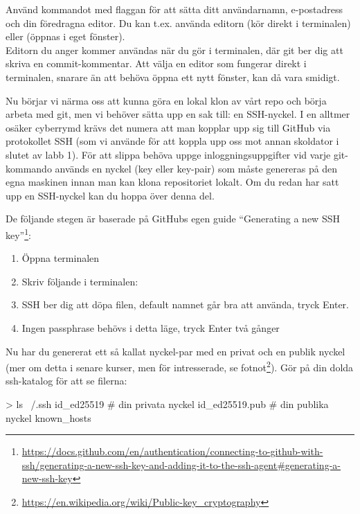 \begin{Datorarbete}
	\code{[\ref{git-config}]} Använd kommandot  med flaggan  för att sätta ditt användarnamn, e-postadress och din föredragna editor. Du kan t.ex. använda editorn  (kör direkt i terminalen) eller  (öppnas i eget fönster).
	\\

	Editorn du anger kommer användas när du gör  i terminalen, där git ber dig att skriva en commit-kommentar. Att välja en editor som fungerar direkt i terminalen, snarare än att behöva öppna ett nytt fönster, kan då vara smidigt.

	\item Nu börjar vi närma oss att kunna göra en lokal klon av vårt repo och börja arbeta med git, men vi behöver sätta upp en sak till: en SSH-nyckel. I en alltmer osäker cyberrymd krävs det numera att man kopplar upp sig till GitHub via protokollet SSH (som vi använde för att koppla upp oss mot annan skoldator i slutet av labb 1). För att slippa behöva uppge inloggningsuppgifter vid varje git-kommando används en nyckel (key eller key-pair) som måste genereras på den egna maskinen innan man kan klona repositoriet lokalt. Om du redan har satt upp en SSH-nyckel kan du hoppa över denna del.

	\vspace*{3mm}

	\noindent De följande stegen är baserade på GitHubs egen guide ``Generating a new SSH key''\footnote{\url{https://docs.github.com/en/authentication/connecting-to-github-with-ssh/generating-a-new-ssh-key-and-adding-it-to-the-ssh-agent#generating-a-new-ssh-key}}:

	\begin{enumerate}
		\item Öppna terminalen
		\item Skriv följande i terminalen:\\

		\item SSH ber dig att döpa filen, default namnet går bra att använda, tryck Enter.
		\item Ingen passphrase behövs i detta läge, tryck Enter två gånger
	\end{enumerate}


	\noindent Nu har du genererat ett så kallat nyckel-par med en privat och en publik nyckel (mer om detta i senare kurser, men för intresserade, se fotnot\footnote{\url{https://en.wikipedia.org/wiki/Public-key_cryptography}}). Gör  på din dolda ssh-katalog för att se filerna:
	\begin{Code}
		> ls ~/.ssh
		id_ed25519         # din privata nyckel
		id_ed25519.pub     # din publika nyckel
		known_hosts
	\end{Code}


\end{Datorarbete}
